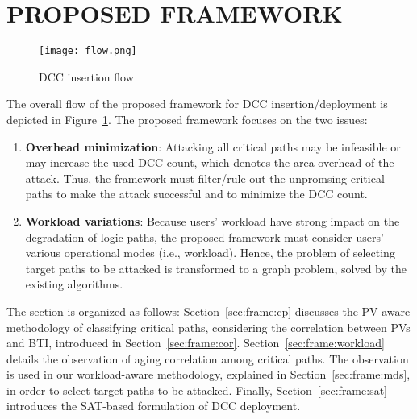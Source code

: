 
\section{PROPOSED FRAMEWORK}
\label{sec:frame}
\begin{figure}
	\centering
	\texttt{[image: flow.png]}
	\caption{DCC insertion flow}
	\label{fig:flow}
\end{figure}
\begin{comment}
\begin{figure}
	\centering
	\texttt{[image: pathset.png]}
	\caption{Classification of critical paths}
	\label{fig:set}
\end{figure}
\end{comment}
The overall flow of the proposed framework for DCC insertion/deployment is depicted in Figure~\ref{fig:flow}. The proposed framework focuses on the two issues: 
\begin{enumerate}
	\item \textbf{Overhead minimization}: Attacking all critical paths may be infeasible or may increase the used DCC count, which denotes the area overhead of the attack. Thus, the framework must filter/rule out the unpromsing critical paths to make the attack successful and to minimize the DCC count. 
	\item \textbf{Workload variations}: Because users' workload have strong impact on the degradation of logic paths, the proposed framework must consider users' various operational modes (i.e., workload). Hence, the problem of selecting target paths to be attacked is transformed to a graph problem, solved by the existing algorithms. 
\end{enumerate}


The section is organized as follows: Section~\ref{sec:frame:cp} discusses the PV-aware methodology of classifying critical paths, considering the correlation between PVs and BTI, introduced in Section~\ref{sec:frame:cor}. Section~\ref{sec:frame:workload} details the observation of aging correlation among critical paths. The observation is used in our workload-aware methodology, explained in Section~\ref{sec:frame:mds}, in order to select target paths to be attacked. Finally, Section~\ref{sec:frame:sat} introduces the SAT-based formulation of DCC deployment.
